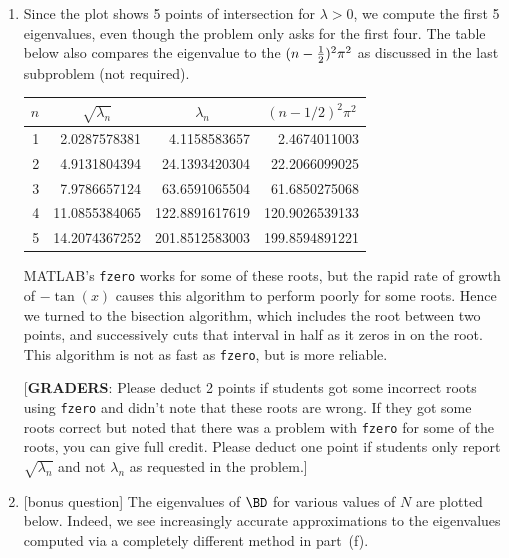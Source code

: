 {\begin{solution}
\begin{enumerate}
\item Since the plot shows 5 points of intersection for $\lambda>0$, we compute 
      the first 5 eigenvalues, even though the problem only asks for the first four.
      The table below also compares the eigenvalue to the $(n-{1\over2})^2\pi^2$
      as discussed in the last subproblem (not required).

\begin{center}\begin{tabular}{rrrr}
  $n$ & \multicolumn{1}{c}{$\sqrt{\lambda_n}$} & \multicolumn{1}{c}{$\lambda_n$} & \multicolumn{1}{c}{$(n-1/2)^2 \pi^2$} \\ \hline
1 &    2.0287578381 &    4.1158583657 &   2.4674011003 \\
2 &    4.9131804394 &   24.1393420304 &  22.2066099025 \\
3 &    7.9786657124 &   63.6591065504 &  61.6850275068 \\
4 &   11.0855384065 &  122.8891617619 & 120.9026539133 \\
5 &   14.2074367252 &  201.8512583003 & 199.8594891221
\end{tabular}\end{center}

MATLAB's {\tt fzero} works for some of these roots, but the rapid rate of
growth of $-\tan(x)$ causes this algorithm to perform poorly for some roots.
Hence we turned to the bisection algorithm, which includes
the root between two points, and successively cuts that interval in half
as it zeros in on the root.  
This algorithm is not as fast as {\tt fzero}, but is more reliable.

[\textbf{GRADERS}: Please deduct 2 points if students got some incorrect
roots using {\tt fzero} and didn't note that these roots are wrong.
If they got some roots correct but noted that there was a problem 
with {\tt fzero} for some of the roots, you can give full credit.
Please deduct one point if students only report $\sqrt{\lambda_n}$ 
and not $\lambda_n$ as requested in the problem.]



\item {[bonus question]}
The eigenvalues of $\BD$ for various values of $N$ are plotted below.
Indeed, we see increasingly accurate approximations to the eigenvalues 
computed via a completely different method in part~(f).


\end{enumerate}
\end{solution}}
